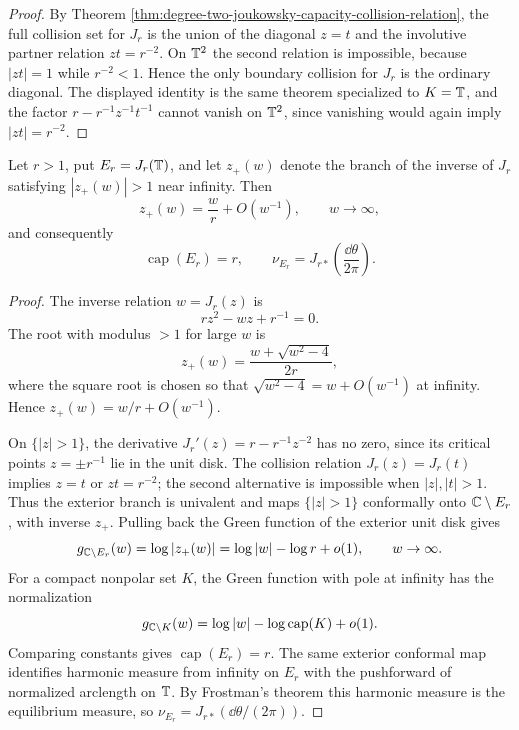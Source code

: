 \begin{proof}
By Theorem \ref{thm:degree-two-joukowsky-capacity-collision-relation}, the full collision set for \(J_r\) is the union of the diagonal \(z=t\) and the involutive partner relation \(zt=r^{-2}\).  On \(\mathbb{T}^2\) the second relation is impossible, because \(|zt|=1\) while \(r^{-2}<1\).  Hence the only boundary collision for \(J_r\) is the ordinary diagonal.  The displayed identity is the same theorem specialized to \(K=\mathbb{T}\), and the factor \(r-r^{-1}z^{-1}t^{-1}\) cannot vanish on \(\mathbb{T}^2\), since vanishing would again imply \(|zt|=r^{-2}\).
\end{proof}

\begin{lemma}\label{lem:joukowsky-ellipse-capacity-normalization}
Let \(r>1\), put \(E_r=J_r(\mathbb{T})\), and let \(z_+(w)\) denote the branch
of the inverse of \(J_r\) satisfying \(|z_+(w)|>1\) near infinity.  Then
\[
z_+(w)=\frac{w}{r}+O(w^{-1}),\qquad w\to\infty,
\]
and consequently
\[
\operatorname{cap}(E_r)=r,\qquad
\nu_{E_r}=J_{r\ast}\!\left(\frac{\dd\theta}{2\pi}\right).
\]
\end{lemma}

\begin{proof}
The inverse relation \(w=J_r(z)\) is
\[
r z^2-wz+r^{-1}=0.
\]
The root with modulus \(>1\) for large \(w\) is
\[
z_+(w)=\frac{w+\sqrt{w^2-4}}{2r},
\]
where the square root is chosen so that \(\sqrt{w^2-4}=w+O(w^{-1})\)
at infinity.  Hence \(z_+(w)=w/r+O(w^{-1})\).

On \(\{|z|>1\}\), the derivative \(J_r'(z)=r-r^{-1}z^{-2}\) has no zero,
since its critical points \(z=\pm r^{-1}\) lie in the unit disk.  The
collision relation \(J_r(z)=J_r(t)\) implies \(z=t\) or \(zt=r^{-2}\);
the second alternative is impossible when \(|z|,|t|>1\).  Thus the
exterior branch is univalent and maps \(\{|z|>1\}\) conformally onto
\(\mathbb{C}\setminus E_r\), with inverse \(z_+\).  Pulling back the Green
function of the exterior unit disk gives
\[
g_{\mathbb{C}\setminus E_r}(w)=\log|z_+(w)|
=\log|w|-\log r+o(1),\qquad w\to\infty.
\]
For a compact nonpolar set \(K\), the Green function with pole at infinity
has the normalization
\[
g_{\mathbb{C}\setminus K}(w)=\log|w|-\log\operatorname{cap}(K)+o(1).
\]
Comparing constants gives \(\operatorname{cap}(E_r)=r\).  The same
exterior conformal map identifies harmonic measure from infinity on
\(E_r\) with the pushforward of normalized arclength on \(\mathbb{T}\).  By
Frostman's theorem this harmonic measure is the equilibrium measure,
so \(\nu_{E_r}=J_{r\ast}(\dd\theta/(2\pi))\).
\end{proof}

